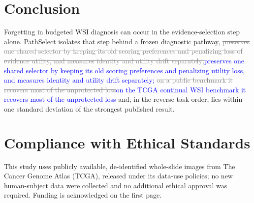 \documentclass{article}
\newif\ifmarkup \markuptrue
\newcommand{\del}[1]{\ifmarkup\textcolor{gray}{\sout{#1}}\fi}
\newcommand{\ins}[1]{\ifmarkup\textcolor{blue}{#1}\else#1\fi}
\newcommand{\rep}[2]{\del{#1}\ins{#2}}
\begin{document}
\section{Conclusion}

Forgetting in budgeted WSI diagnosis can occur in the evidence-selection step alone. PathSelect isolates that step behind a frozen diagnostic pathway, \rep{preserves one shared selector by keeping its old scoring preferences and penalizing loss of evidence utility, and measures identity and utility drift separately;}{preserves one shared selector by keeping its old scoring preferences and penalizing utility loss, and measures identity and utility drift separately;} \rep{on a public benchmark it recovers most of the unprotected loss}{on the TCGA continual WSI benchmark it recovers most of the unprotected loss} and, in the reverse task order, lies within one standard deviation of the strongest published result.




\section*{Compliance with Ethical Standards}
This study uses publicly available, de-identified whole-slide images from The Cancer Genome Atlas (TCGA), released under its data-use policies; no new human-subject data were collected and no additional ethical approval was required. Funding is acknowledged on the first page.
\end{document}
